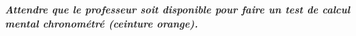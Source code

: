 \exo{}

\begin{center}
	\textbf{\textit{Attendre que le professeur soit disponible pour faire un test de calcul mental chronométré (ceinture orange).}}
 	
\end{center}